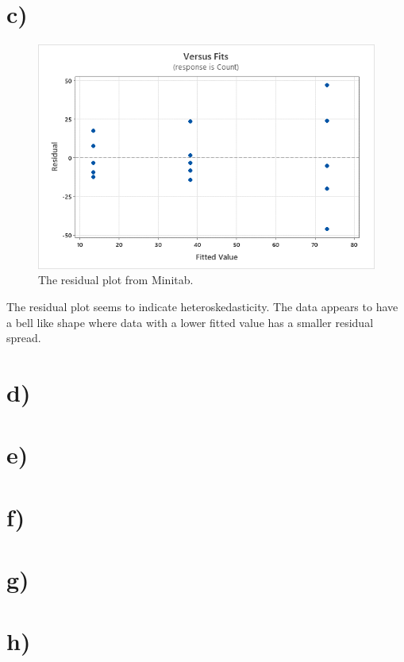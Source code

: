 \documentclass{article}
\begin{document}
\section*{c)}
\begin{figure}[h]
    \centering
    \includegraphics[width=1\textwidth]{./images/c.png}
    \caption{The residual plot from Minitab.}
    \label{fig:c}
  \end{figure}
The residual plot seems to indicate heteroskedasticity. The data appears to have a bell like shape where data with a lower fitted value has a smaller residual spread.
\section*{d)}
\section*{e)}
\section*{f)}
\section*{g)}
\section*{h)}
\end{document}
